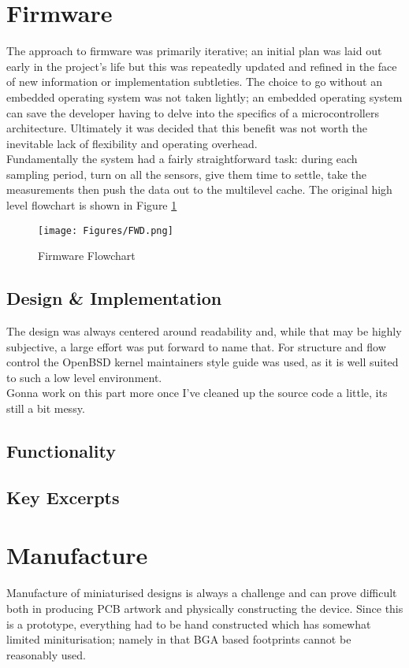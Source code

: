 \documentclass[12pt,openany,a4paper]{book}
\begin{document}
	\section{Firmware}
		The approach to firmware was primarily iterative; an initial plan was laid out early in the project's life but this was repeatedly updated and refined in the face of new information or implementation subtleties. The choice to go without an embedded operating system was not taken lightly; an embedded operating system can save the developer having to delve into the specifics of a microcontrollers architecture. Ultimately it was decided that this benefit was not worth the inevitable lack of flexibility and operating overhead. \\
		
		Fundamentally the system had a fairly straightforward task: during each sampling period, turn on all the sensors, give them time to settle, take the measurements then push the data out to the multilevel cache. The original high level flowchart is shown in Figure \ref{fig:FWD}
		
		\begin{figure}[H]
			\centering
			\texttt{[image: Figures/FWD.png]}
			\caption{Firmware Flowchart}
			\label{fig:FWD}
		\end{figure}		

		\newpage
		\subsection{Design \& Implementation} %
		The design was always centered around readability and, while that may be highly subjective, a large effort was put forward to name that. For structure and flow control the OpenBSD kernel maintainers style guide \cite{BSDstyle} was used, as it is well suited to such a low level environment. \\
		
		Gonna work on this part more once I've cleaned up the source code a little, its still a bit messy.
		\subsection{Functionality}
		\subsection{Key Excerpts}
	\newpage
	\section{Manufacture}
		Manufacture of miniaturised designs is always a challenge and can prove difficult both in producing PCB artwork and physically constructing the device. Since this is a prototype, everything had to be hand constructed which has somewhat limited miniturisation; namely in that BGA based footprints cannot be reasonably used. 
		
\end{document}
